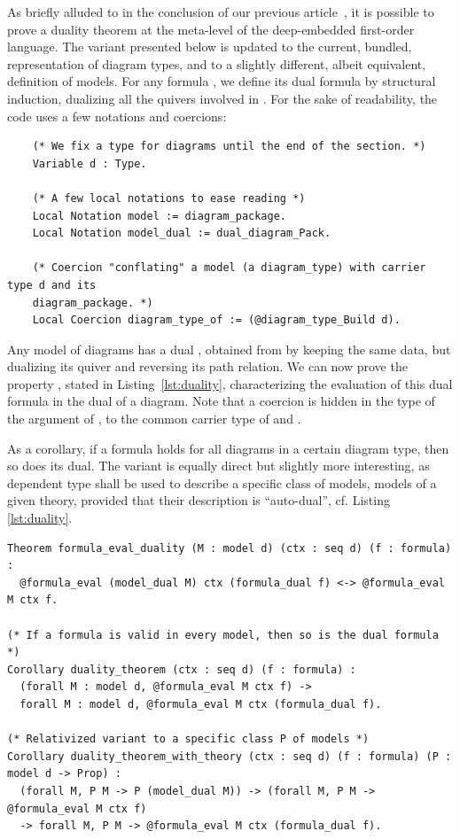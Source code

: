 \documentclass[a4paper,UKenglish,cleveref, autoref, thm-restate]{lipics-v2021}
\begin{document}
As briefly alluded to in the conclusion of our previous article~\cite{DBLP:conf/csl/MahboubiP24}, it is possible to prove a duality theorem at the meta-level of the deep-embedded first-order language. The variant presented below is updated to the current, bundled, representation of diagram types, and to a slightly different, albeit equivalent, definition of models. For any formula , we define its dual formula  by structural induction, dualizing all the quivers involved in . For the sake of readability, the code uses a few notations and coercions:
\begin{verbatim}
    (* We fix a type for diagrams until the end of the section. *)
    Variable d : Type.

    (* A few local notations to ease reading *)
    Local Notation model := diagram_package.
    Local Notation model_dual := dual_diagram_Pack.

    (* Coercion "conflating" a model (a diagram_type) with carrier type d and its
    diagram_package. *)
    Local Coercion diagram_type_of := (@diagram_type_Build d).
\end{verbatim}

Any model of diagrams  has a dual , obtained from  by keeping the same data, but dualizing its quiver and reversing its path relation. We can now prove the property , stated in Listing~\ref{lst:duality}, characterizing the evaluation of this dual formula in the dual of a diagram. Note that a coercion is hidden in the type of the argument  of , to the common carrier type of  and .

As a corollary, if a formula holds for all diagrams in a certain diagram type, then so does its dual. The variant  is equally direct but slightly more interesting, as dependent type  shall be used to describe a specific class of models, \eg{} models of a given theory, provided that their description is \enquote{auto-dual}, cf. Listing \ref{lst:duality}.
\begin{listing}[h!]
\begin{verbatim}
Theorem formula_eval_duality (M : model d) (ctx : seq d) (f : formula) :
  @formula_eval (model_dual M) ctx (formula_dual f) <-> @formula_eval M ctx f.

(* If a formula is valid in every model, then so is the dual formula *)
Corollary duality_theorem (ctx : seq d) (f : formula) :
  (forall M : model d, @formula_eval M ctx f) ->
  forall M : model d, @formula_eval M ctx (formula_dual f).

(* Relativized variant to a specific class P of models *)
Corollary duality_theorem_with_theory (ctx : seq d) (f : formula) (P : model d -> Prop) :
  (forall M, P M -> P (model_dual M)) -> (forall M, P M -> @formula_eval M ctx f)
  -> forall M, P M -> @formula_eval M ctx (formula_dual f).
\end{verbatim}
\caption{Duality theorems}\label{lst:duality}
\end{listing}
\end{document}
